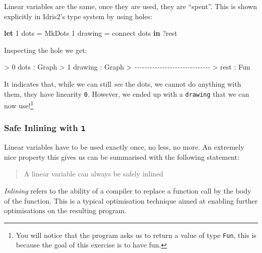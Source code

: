 \documentclass[
]{article}
\newenvironment{Shaded}{}{}
\newcommand{\CommentTok}[1]{\textcolor[rgb]{0.38,0.63,0.69}{\textit{#1}}}
\newcommand{\DataTypeTok}[1]{\textcolor[rgb]{0.56,0.13,0.00}{#1}}
\newcommand{\DecValTok}[1]{\textcolor[rgb]{0.25,0.63,0.44}{#1}}
\newcommand{\KeywordTok}[1]{\textcolor[rgb]{0.00,0.44,0.13}{\textbf{#1}}}
\newcommand{\NormalTok}[1]{#1}
\newcommand{\OperatorTok}[1]{\textcolor[rgb]{0.40,0.40,0.40}{#1}}
\newcommand{\OtherTok}[1]{\textcolor[rgb]{0.00,0.44,0.13}{#1}}
\begin{document}
Linear variables are the same, once they are used, they are ``spent''.
This is shown explicitly in Idris2's type system by using holes:

\begin{Shaded}
\begin{Highlighting}[]
\KeywordTok{let} \DecValTok{1}\NormalTok{ dots }\OtherTok{=} \DataTypeTok{MkDots}
    \DecValTok{1}\NormalTok{ drawing }\OtherTok{=}\NormalTok{ connect dots }\KeywordTok{in}
    \OperatorTok{?}\NormalTok{rest}
\end{Highlighting}
\end{Shaded}

Inspecting the hole we get:

\begin{Shaded}
\begin{Highlighting}[]
\OperatorTok{\textgreater{}}  \DecValTok{0}\NormalTok{ dots }\OperatorTok{:} \DataTypeTok{Graph}
\OperatorTok{\textgreater{}}  \DecValTok{1}\NormalTok{ drawing }\OperatorTok{:} \DataTypeTok{Graph}
\OperatorTok{\textgreater{}} \CommentTok{{-}{-}{-}{-}{-}{-}{-}{-}{-}{-}{-}{-}{-}{-}{-}{-}{-}{-}{-}{-}{-}{-}{-}{-}{-}{-}{-}{-}{-}{-}}
\OperatorTok{\textgreater{}}\NormalTok{ rest }\OperatorTok{:} \DataTypeTok{Fun}
\end{Highlighting}
\end{Shaded}

It indicates that, while we can still \emph{see} the dots, we cannot do
anything with them, they have linearity \texttt{0}. However, we ended up
with a \texttt{drawing} that we can now use!\footnote{You will notice
  that the program asks us to return a value of type \texttt{Fun}, this
  is because the goal of this exercise is to have fun.}

\hypertarget{safe-inlining-with-1}{%
\subsubsection{\texorpdfstring{Safe Inlining with
\texttt{1}}{Safe Inlining with 1}}\label{safe-inlining-with-1}}

Linear variables have to be used exactly once, no less, no more. An
extremely nice property this gives us can be summarised with the
following statement:

\begin{quote}
A linear variable can always be safely inlined
\end{quote}

\emph{Inlining} refers to the ability of a compiler to replace a
function call by the body of the function. This is a typical
optimisation technique aimed at enabling further optimisations on the
resulting program.
\end{document}
